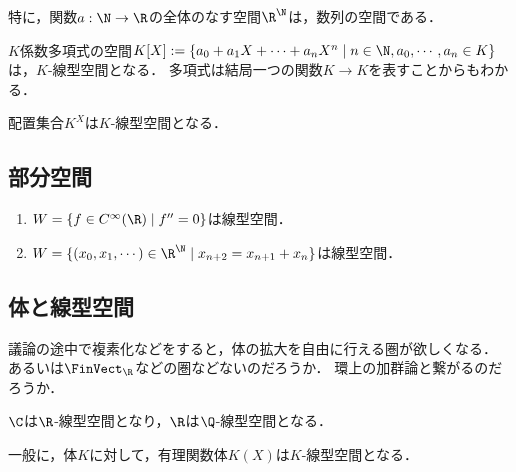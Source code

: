 \documentclass[uplatex, dvipdfmx]{jsreport}
\begin{document}
\begin{example}\label{example-space-of-sequences}
    特に，関数$a:\N\to\R$の全体のなす空間$\R^\N$は，数列の空間である．
\end{example}

\begin{example}
    $K$係数多項式の空間$K[X]:=\{a_0+a_1X+\cdots+a_nX^n\mid n\in\N,a_0,\cdots,a_n\in K\}$は，$K$-線型空間となる．
    多項式は結局一つの関数$K\to K$を表すことからもわかる．
\end{example}

\begin{example}
    配置集合$K^X$は$K$-線型空間となる．
\end{example}

\subsection{部分空間}

\begin{example}[部分空間になるもの]\mbox{}
    \begin{enumerate}
        \item $W=\{f\in C^\infty(\R)\mid  f''=0\}$は線型空間．
        \item $W=\{(x_0,x_1,\cdots)\in \R^\N\mid x_{n+2}=x_{n+1}+x_n\}$は線型空間．
    \end{enumerate}
\end{example}

\subsection{体と線型空間}

\begin{tcolorbox}[colframe=ForestGreen, colback=ForestGreen!10!white, breakable]
    議論の途中で複素化などをすると，体の拡大を自由に行える圏が欲しくなる．
    あるいは$\FinVect_\R$などの圏などないのだろうか．
    環上の加群論と繋がるのだろうか．
\end{tcolorbox}

\begin{example}
    $\C$は$\R$-線型空間となり，$\R$は$\Q$-線型空間となる．

    一般に，体$K$に対して，有理関数体$K(X)$は$K$-線型空間となる．
\end{example}
\end{document}

